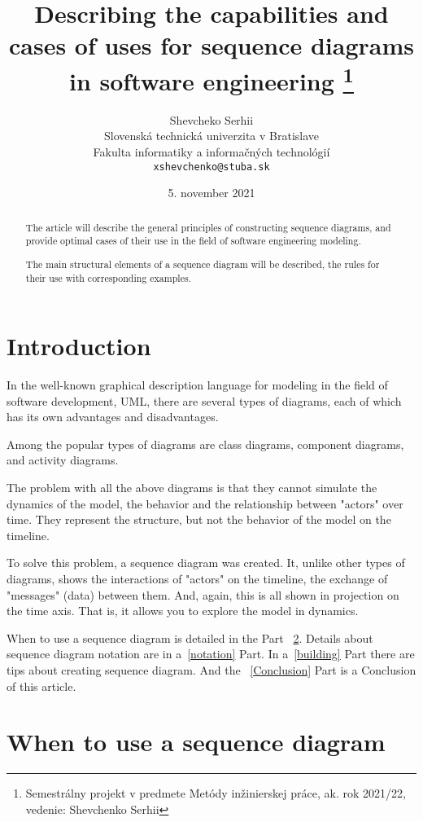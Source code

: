 \documentclass[10pt,twoside,slovak,a4paper]{article}
\title{Describing the capabilities and cases of uses for sequence diagrams in software engineering \thanks{Semestrálny projekt v predmete Metódy inžinierskej práce, ak. rok 2021/22, vedenie: Shevchenko Serhii}} %
\author{Shevcheko Serhii\\[2pt]
	{\small Slovenská technická univerzita v Bratislave}\\
	{\small Fakulta informatiky a informačných technológií}\\
	{\small \texttt{xshevchenko@stuba.sk}}
	}
\date{\small 5. november 2021}
\begin{document}
\maketitle

\begin{abstract}
The article will describe the general principles of constructing sequence diagrams, and provide optimal cases of their use in the field of software engineering modeling.

The main structural elements of a sequence diagram will be described, the rules for their use with corresponding examples.
\end{abstract}



\section{Introduction}

In the well-known graphical description language for modeling in the field of software development, UML, there are several types of diagrams, each of which has its own advantages and disadvantages.

Among the popular types of diagrams are class diagrams, component diagrams, and activity diagrams.

The problem with all the above diagrams is that they cannot simulate the dynamics of the model, the behavior and the relationship between "actors" over time. They represent the structure, but not the behavior of the model on the timeline.

To solve this problem, a sequence diagram was created. It, unlike other types of diagrams, shows the interactions of "actors" on the timeline, the exchange of "messages" (data) between them. And, again, this is all shown in projection on the time axis. That is, it allows you to explore the model in dynamics.

When to use a sequence diagram is detailed in the Part ~\ref{when}. Details about sequence diagram notation are in a~\ref{notation} Part. In a~\ref{building} Part there are tips about creating sequence diagram. And the ~\ref{Conclusion} Part is a Conclusion of this article.

\section{When to use a sequence diagram} \label{when}

\end{document}
